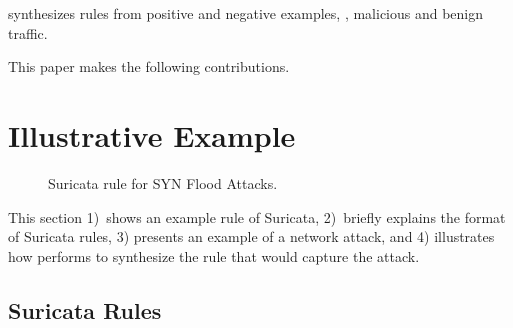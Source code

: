 \documentclass[runningheads]{llncs}
\begin{document}

\tname{} synthesizes rules from positive and negative examples, \ie{},
malicious and benign traffic.



This paper makes the following contributions.

\section{Illustrative Example}
\label{sec:suri-metas-coverage}

\begin{figure}[t]
  
  \caption{Suricata rule for SYN Flood Attacks.}
  \label{fig:synflood-example}
\end{figure}

This section 1)~shows an example rule of Suricata, 2)~briefly explains
the format of Suricata rules, 3) presents an example of a network
attack, and 4) illustrates how \tname{} performs to synthesize the
rule that would capture the attack.

\subsection{Suricata Rules}
\label{sec:example-suricata-rules}
\end{document}
